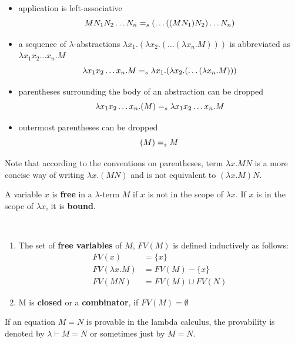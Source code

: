 \begin{remark} \label{rem:parcon} \ \\
\vspace{-15pt}
\begin{itemize}
\item application is left-associative
$$MN_1 N_2 \dots N_n =_s (\dots ( (MN_1) N_2 ) \dots N_n)$$
\item  a sequence of $\lambda$-abstractions $\lambda x_1. (\lambda x_2. ( \dots (\lambda x_n. M) )  ) $ is abbreviated as \\ $\lambda x_1 x_2 \dots x_n.M$
$$\lambda x_1 x_2 \dots x_n.M =_s \lambda x_1. (\lambda x_2. ( \dots (\lambda x_n. M) )  )  $$
\item parentheses surrounding the body of an abstraction can be dropped
$$\lambda x_1 x_2 \dots x_n.(M) =_s \lambda x_1 x_2 \dots x_n.M$$
\item outermost parentheses can be dropped 
$$(M) =_s M$$
\end{itemize}
\end{remark}
Note that according to the conventions on parentheses, term $\lambda x. MN$ is a more concise way of writing $\lambda x. (MN)$ and is not equivalent to $(\lambda x. M)N$. 

\begin{definition} A variable $x$ is \textbf{free} in a $\lambda$-term $M$ if $x$ is not in the scope of $\lambda x$. If $x$ is in the scope of $\lambda x$, it is \textbf{bound}.
\end{definition}

\begin{definition} \ 
\begin{enumerate}
\item The set of \textbf{free variables} of $M$, $FV(M)$ is defined inductively as follows:
\begin{align*}
 FV(x)  & = \{ x \} \\
 FV(\lambda x.M)  & = FV(M) - \{ x \} \\
 FV(MN)  & = FV(M) \cup FV(N)
\end{align*}
\item M is \textbf{closed} or a \textbf{combinator}, if $FV(M) = \emptyset$

\end{enumerate}
\end{definition}

If an equation $M=N$ is provable in the lambda calculus, the provability is denoted by $\lambda \vdash M = N$
or sometimes just by $M=N$.

